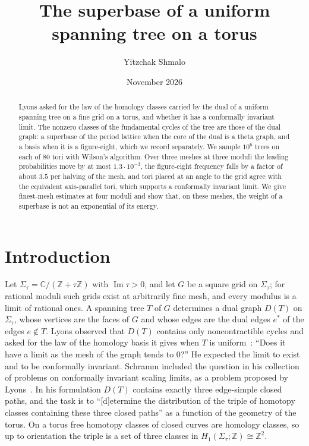\documentclass[11pt]{amsart}
\title[The superbase of a uniform spanning tree on a torus]{The superbase of a uniform spanning tree on a torus}
\author{Yitzchak Shmalo}
\date{November 2026}
\theoremstyle{definition}
\theoremstyle{remark}
\newcommand{\Z}{\mathbb{Z}}
\newcommand{\C}{\mathbb{C}}
\begin{document}
\begin{abstract}
Lyons asked for the law of the homology classes carried by the dual of a uniform spanning tree on a fine grid on a
torus, and whether it has a conformally invariant limit. The nonzero classes of the fundamental cycles of the tree are
those of the dual graph: a superbase of the period lattice when the core of the dual is a theta graph, and a basis
when it is a figure-eight, which we record separately. We sample $10^6$ trees on each of $80$ tori with Wilson's
algorithm. Over three meshes at three moduli the leading probabilities move by at most $1.3\cdot10^{-3}$, the
figure-eight frequency falls by a factor of about $3.5$ per halving of the mesh, and tori placed at an angle to the grid
agree with the equivalent axis-parallel tori, which supports a conformally invariant limit. We give finest-mesh
estimates at four moduli and show that, on these meshes, the weight of a superbase is not an exponential of its
energy.
\end{abstract}
\maketitle

\section{Introduction}

Let $\Sigma_\tau=\C/(\Z+\tau\Z)$ with $\operatorname{Im}\tau>0$, and let $G$ be a square grid on $\Sigma_\tau$; for
rational moduli such grids exist at arbitrarily fine mesh, and every modulus is a limit of rational ones. A spanning tree
$T$ of $G$ determines a dual graph $D(T)$ on $\Sigma_\tau$, whose vertices are the faces of $G$ and whose edges are the
dual edges $e^*$ of the edges $e\notin T$. Lyons observed that $D(T)$ contains only noncontractible cycles and asked
for the law of the homology basis it gives when $T$ is uniform~\cite[Section~12]{Ly03}: ``Does it have a limit as the
mesh of the graph tends to 0?'' He expected the limit to exist and to be conformally invariant. Schramm included the
question in his collection of problems on conformally invariant scaling limits, as a problem proposed by
Lyons~\cite[Problem~6.2]{Sch07}. In his formulation $D(T)$ contains exactly three edge-simple closed paths, and the task
is to ``[d]etermine the distribution of the triple of homotopy classes containing these three closed paths'' as a
function of the geometry of the torus. On a torus free homotopy classes of closed curves are homology classes, so up to
orientation the triple is a set of three classes in $H_1(\Sigma_\tau;\Z)\cong\Z^2$.
\end{document}
